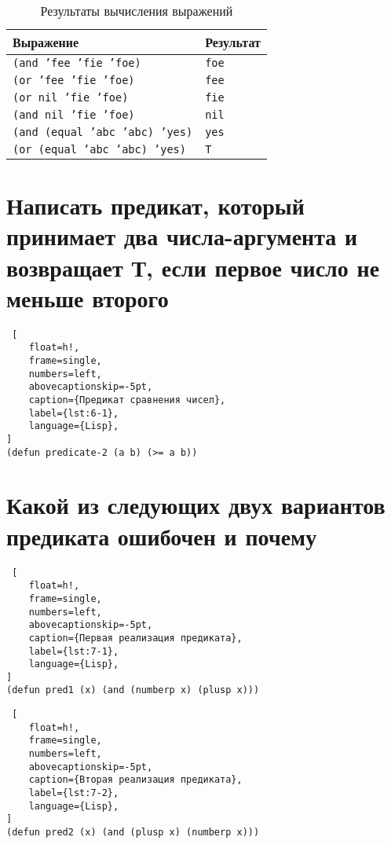 \begin{table}[!ht]
	\begin{center}
		\caption{Результаты вычисления выражений}
		\label{tbl:5-1}
		\begin{tabular}{|l|l|}
			\hline
			\bfseries Выражение & \bfseries Результат\\\hline
            \texttt{(and 'fee 'fie 'foe)} & \texttt{foe}\\\hline
            \texttt{(or 'fee 'fie 'foe)} & \texttt{fee}\\\hline
            \texttt{(or nil 'fie 'foe)} & \texttt{fie}\\\hline
            \texttt{(and nil 'fie 'foe)} & \texttt{nil}\\\hline
            \texttt{(and (equal 'abc 'abc) 'yes)} & \texttt{yes}\\\hline
            \texttt{(or (equal 'abc 'abc) 'yes)} & \texttt{T}\\\hline
		\end{tabular}
	\end{center}
\end{table}


\section{Написать предикат, который принимает два числа-аргумента и возвращает Т, если первое число не меньше второго}

\begin{lstlisting} [
	float=h!,
	frame=single,
	numbers=left,
	abovecaptionskip=-5pt,
	caption={Предикат сравнения чисел},
	label={lst:6-1},
	language={Lisp},
]
(defun predicate-2 (a b) (>= a b))
\end{lstlisting}

\section{Какой из следующих двух вариантов предиката ошибочен и почему}

\begin{lstlisting} [
	float=h!,
	frame=single,
	numbers=left,
	abovecaptionskip=-5pt,
	caption={Первая реализация предиката},
	label={lst:7-1},
	language={Lisp},
]
(defun pred1 (x) (and (numberp x) (plusp x))) 
\end{lstlisting}

\begin{lstlisting} [
	float=h!,
	frame=single,
	numbers=left,
	abovecaptionskip=-5pt,
	caption={Вторая реализация предиката},
	label={lst:7-2},
	language={Lisp},
]
(defun pred2 (x) (and (plusp x) (numberp x)))
\end{lstlisting}

